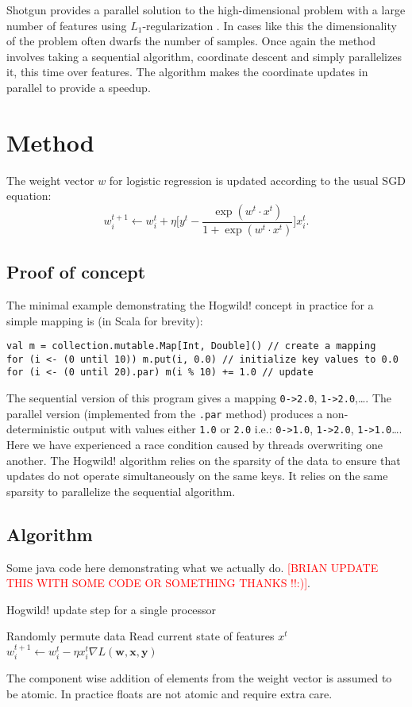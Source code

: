 \documentclass{article} %
\begin{document}
Shotgun provides a parallel solution to the high-dimensional problem with a large number of features using $L_1$-regularization \cite{ng2004feature}. In cases like this the dimensionality of the problem often dwarfs the number of samples. Once again the method involves taking a sequential algorithm, coordinate descent and simply parallelizes it, this time over features. The algorithm makes the coordinate updates in parallel to provide a speedup.

\section{Method}
The weight vector $w$ for logistic regression is updated according to the usual SGD equation:
\begin{equation}
w_i^{t+1} \leftarrow w_i^t + \eta \bigg[y^t - \frac{\exp{(w^t \cdot x^t)}}{1 + \exp{(w^t \cdot x^t)}} \bigg]x_i^t.
\end{equation}

 
\subsection{Proof of concept}
The minimal example demonstrating the Hogwild! concept in practice for a simple mapping is (in Scala for brevity):
\begin{lstlisting}
val m = collection.mutable.Map[Int, Double]() // create a mapping
for (i <- (0 until 10)) m.put(i, 0.0) // initialize key values to 0.0
for (i <- (0 until 20).par) m(i % 10) += 1.0 // update
\end{lstlisting}
The sequential version of this program gives a mapping \verb+0->2.0+, \verb+1->2.0+,\ldots. The parallel version (implemented from the \verb+.par+ method) produces a non-deterministic output with values either \verb+1.0+ or \verb+2.0+ i.e.: \verb+0->1.0+, \verb+1->2.0+, \verb+1->1.0+\ldots. Here we have experienced a race condition caused by threads overwriting one another. The Hogwild! algorithm relies on the sparsity of the data to ensure that updates do not operate simultaneously on the same keys. It relies on the same sparsity to parallelize the sequential algorithm.

\subsection{Algorithm}
Some java code here demonstrating what we actually do. \textcolor{red}{[BRIAN UPDATE THIS WITH SOME CODE OR SOMETHING THANKS !!:)]}.
\begin{algorithm}
  \caption{Hogwild! update step for a single processor}

  \begin{algorithmic}
  \Loop
  \State Randomly permute data
  \State Read current state of features $x^t$
  \State $w^{t+1}_i \leftarrow w_i^t - \eta x_i^t \nabla L(\mathbf{w}, \mathbf{x}, \mathbf{y})$
  \EndFor
  \EndLoop
  \end{algorithmic}
\end{algorithm}
The component wise addition of elements from the weight vector is assumed to be atomic. In practice floats are not atomic and require extra care.
\end{document}
